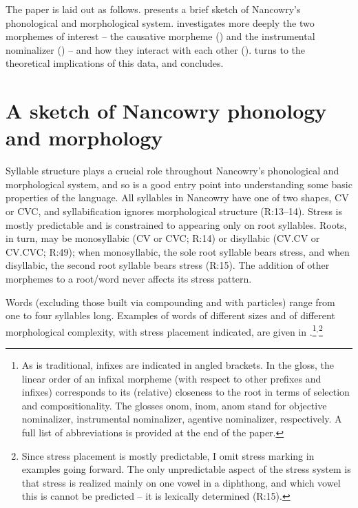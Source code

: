 \documentclass[output=paper]{langscibook}
\begin{document}
The paper is laid out as follows.  presents a brief sketch of Nancowry's phonological and morphological system.  investigates more deeply the two morphemes of interest -- the causative morpheme () and the instrumental nominalizer () -- and how they interact with each other ().  turns to the theoretical implications of this data, and  concludes.

\section{A sketch of Nancowry phonology and morphology}\label{sec:kalin:2}

Syllable structure plays a crucial role throughout Nancowry's phonological and morphological system, and so is a good entry point into understanding some basic properties of the language. All syllables in Nancowry have one of two shapes, CV or CVC, and syllabification ignores morphological structure (R:13--14). Stress is mostly predictable and is constrained to appearing only on root syllables. Roots, in turn, may be monosyllabic (CV or CVC; R:14) or disyllabic (CV.CV or CV.CVC; R:49); when monosyllabic, the sole root syllable bears stress, and when disyllabic, the second root syllable bears stress (R:15). The addition of other morphemes to a root/word never affects its stress pattern. 

Words (excluding those built via compounding and with particles) range from one to four syllables long. Examples of words of different sizes and of different morphological complexity, with stress placement indicated, are given in \Next.\footnote{As is traditional, infixes are indicated in angled brackets. In the gloss, the linear order of an infixal morpheme (with respect to other prefixes and infixes) corresponds to its (relative) closeness to the root in terms of selection and compositionality. The glosses {\sc onom, inom, anom} stand for objective nominalizer, instrumental nominalizer, agentive nominalizer, respectively. A full list of abbreviations is provided at the end of the paper.}$^{,}$\footnote{Since stress placement is mostly predictable, I omit stress marking in examples going forward. The only unpredictable aspect of the stress system is that stress is realized mainly on one vowel in a diphthong, and which vowel this is cannot be predicted -- it is lexically determined (R:15).}
\end{document}
